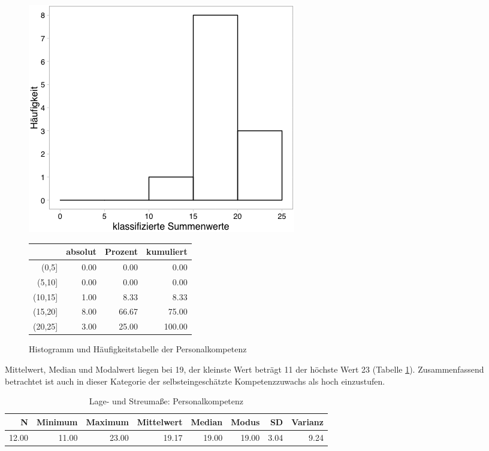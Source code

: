 \documentclass[12pt,smallheadings, bibliography=totoc]{scrartcl}
\begin{document}
\begin{figure}[H]
\begin{minipage}{.4\linewidth}
\includegraphics[width=0.8\linewidth]{Anhang/PKHistnn.png}

\end{minipage}
\begin{minipage}{.4\linewidth}
\centering
\raisebox{\depth}
{\begin{tabular}{rrrr}
  \hline
 & absolut & Prozent & kumuliert \\
  \hline
(0,5] & 0.00 & 0.00 & 0.00 \\
  (5,10] & 0.00 & 0.00 & 0.00 \\
  (10,15] & 1.00 & 8.33 & 8.33 \\
  (15,20] & 8.00 & 66.67 & 75.00 \\
  (20,25] & 3.00 & 25.00 & 100.00 \\
   \hline
\end{tabular}

}
\label{tab:defis}
\end{minipage}
\caption{Histogramm und Häufigkeitstabelle der Personalkompetenz}
\label{fig:PK}
\end{figure}

Mittelwert, Median und Modalwert liegen bei 19, der kleinste Wert
beträgt 11 der höchste Wert 23 (Tabelle \ref{tab:lPK}). Zusammenfassend
betrachtet ist auch in dieser Kategorie der selbsteingeschätzte
Kompetenzzuwachs als hoch einzustufen.

\begin{table}[H]
\centering
\caption{Lage- und Streumaße: Personalkompetenz}
\label{tab:lPK}
\begin{tabular}{rrrrrrrr}
  \hline
  N & Minimum & Maximum & Mittelwert & Median & Modus & SD & Varianz \\
  \hline
  12.00 & 11.00 & 23.00 & 19.17 & 19.00 & 19.00 & 3.04 & 9.24 \\
   \hline
\end{tabular}
\end{table}
\end{document}
